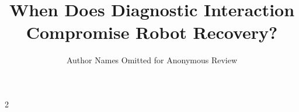 \documentclass[conference]{IEEEtran}
\begin{document}
\title{When Does Diagnostic Interaction Compromise Robot Recovery?}
\author{Author Names Omitted for Anonymous Review}
\maketitle

\clearpage\onecolumn
\begin{multicols}{2}


\end{multicols}
\end{document}
